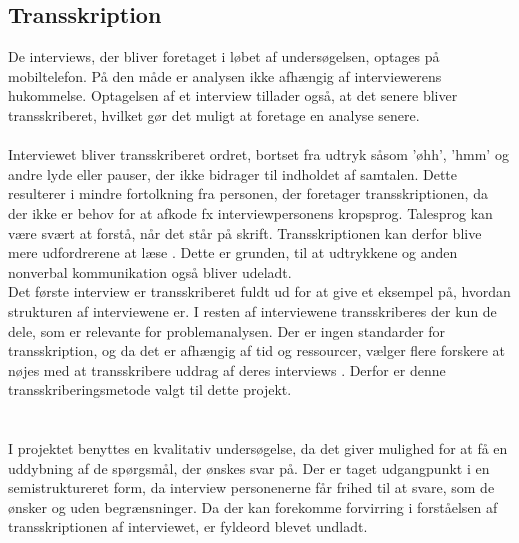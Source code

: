 \subsection{Transskription}
De interviews, der bliver foretaget i løbet af undersøgelsen, optages på mobiltelefon. På den måde er analysen ikke afhængig af interviewerens hukommelse. Optagelsen af et interview tillader også, at det senere bliver transskriberet, hvilket gør det muligt at foretage en analyse senere. 
\\
\\
Interviewet bliver transskriberet ordret, bortset fra udtryk såsom 'øhh', 'hmm' og andre lyde eller pauser, der ikke bidrager til indholdet af samtalen. Dette resulterer i mindre fortolkning fra personen, der foretager transskriptionen, da der ikke er behov for at afkode fx interviewpersonens kropsprog. Talesprog kan være svært at forstå, når det står på skrift. Transskriptionen kan derfor blive mere udfordrerene at læse \citep{kvale2015}. Dette er grunden, til at udtrykkene og anden nonverbal kommunikation også bliver udeladt. 
\\
Det første interview er transskriberet fuldt ud for at give et eksempel på, hvordan strukturen af interviewene er. I resten af interviewene transskriberes der kun de dele, som er relevante for problemanalysen. Der er ingen standarder for transskription, og da det er afhængig af tid og ressourcer, vælger flere forskere at nøjes med at transskribere uddrag af deres interviews \citep{brinkmann2014}\citep{kvale2015}. Derfor er denne transskriberingsmetode valgt til dette projekt.
\\\\\\
I projektet benyttes en kvalitativ undersøgelse, da det giver mulighed for at få en uddybning af de spørgsmål, der ønskes svar på. Der er taget udgangpunkt i en semistruktureret form, da interview personenerne får frihed til at svare, som de ønsker og uden begrænsninger. Da der kan forekomme forvirring i forståelsen af transskriptionen af interviewet, er fyldeord blevet undladt.
